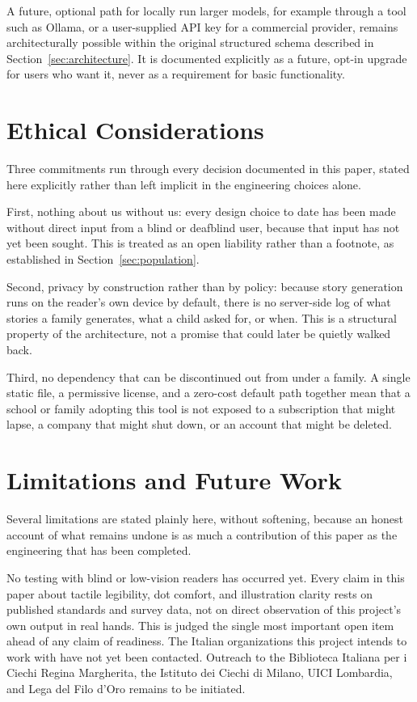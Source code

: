 \documentclass[conference]{IEEEtran}
\begin{document}
A future, optional path for locally run larger models, for example through a tool such as Ollama, or a user-supplied API key for a commercial provider, remains architecturally possible within the original structured schema described in Section~\ref{sec:architecture}. It is documented explicitly as a future, opt-in upgrade for users who want it, never as a requirement for basic functionality.

\section{Ethical Considerations}\label{sec:ethics}

Three commitments run through every decision documented in this paper, stated here explicitly rather than left implicit in the engineering choices alone.

First, nothing about us without us: every design choice to date has been made without direct input from a blind or deafblind user, because that input has not yet been sought. This is treated as an open liability rather than a footnote, as established in Section~\ref{sec:population}.

Second, privacy by construction rather than by policy: because story generation runs on the reader's own device by default, there is no server-side log of what stories a family generates, what a child asked for, or when. This is a structural property of the architecture, not a promise that could later be quietly walked back.

Third, no dependency that can be discontinued out from under a family. A single static file, a permissive license, and a zero-cost default path together mean that a school or family adopting this tool is not exposed to a subscription that might lapse, a company that might shut down, or an account that might be deleted.

\section{Limitations and Future Work}\label{sec:limitations}

Several limitations are stated plainly here, without softening, because an honest account of what remains undone is as much a contribution of this paper as the engineering that has been completed.

No testing with blind or low-vision readers has occurred yet. Every claim in this paper about tactile legibility, dot comfort, and illustration clarity rests on published standards and survey data, not on direct observation of this project's own output in real hands. This is judged the single most important open item ahead of any claim of readiness. The Italian organizations this project intends to work with have not yet been contacted. Outreach to the Biblioteca Italiana per i Ciechi Regina Margherita, the Istituto dei Ciechi di Milano, UICI Lombardia, and Lega del Filo d'Oro remains to be initiated.
\end{document}
